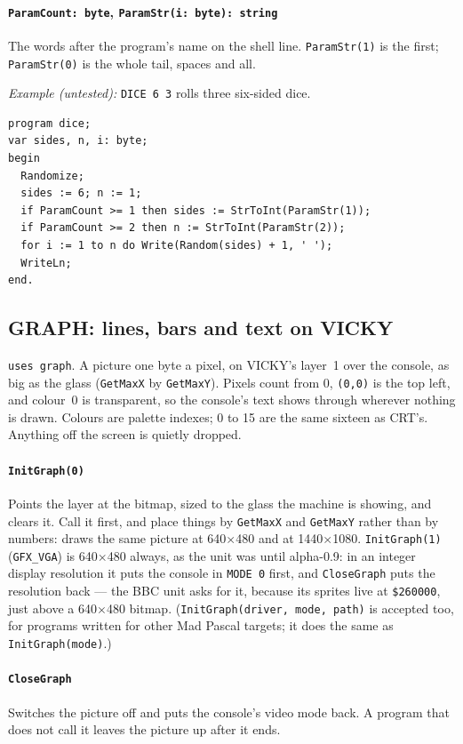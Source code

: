 \paragraph{\texttt{ParamCount: byte}, \texttt{ParamStr(i: byte): string}} The
words after the program's name on the shell line. \verb|ParamStr(1)| is the
first; \verb|ParamStr(0)| is the whole tail, spaces and all.

\noindent\emph{Example (untested):} \verb|DICE 6 3| rolls three six-sided dice.

\begin{verbatim}
program dice;
var sides, n, i: byte;
begin
  Randomize;
  sides := 6; n := 1;
  if ParamCount >= 1 then sides := StrToInt(ParamStr(1));
  if ParamCount >= 2 then n := StrToInt(ParamStr(2));
  for i := 1 to n do Write(Random(sides) + 1, ' ');
  WriteLn;
end.
\end{verbatim}

\subsection*{GRAPH: lines, bars and text on VICKY}
\verb|uses graph|. A picture one byte a pixel, on VICKY's layer~1 over the
console, as big as the glass (\verb|GetMaxX| by \verb|GetMaxY|). Pixels count from 0, \verb|(0,0)| is the top left, and
colour~0 is transparent, so the console's text shows through wherever nothing
is drawn. Colours are palette indexes; 0 to 15 are the same sixteen as CRT's.
Anything off the screen is quietly dropped.

\paragraph{\texttt{InitGraph(0)}} Points the layer at the bitmap, sized to
the glass the machine is showing, and clears it. Call it first, and place
things by \verb|GetMaxX| and \verb|GetMaxY| rather than by numbers:
 draws the same picture at 640$\times$480 and at
1440$\times$1080. \verb|InitGraph(1)| (\verb|GFX_VGA|) is 640$\times$480
always, as the unit was until alpha-0.9: in an integer display resolution
it puts the console in \verb|MODE 0| first, and \verb|CloseGraph| puts the
resolution back --- the BBC unit asks for it, because its sprites live at
\texttt{\$260000}, just above a 640$\times$480 bitmap. (\verb|InitGraph(driver, mode, path)|
is accepted too, for programs written for other Mad Pascal
targets; it does the same as \verb|InitGraph(mode)|.)

\paragraph{\texttt{CloseGraph}} Switches the picture off and puts the
console's video mode back. A program that does not call it leaves the
picture up after it ends.

